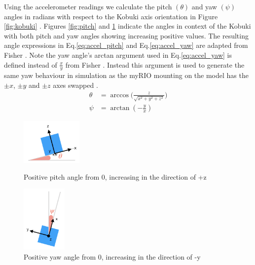 \vspace{-0.2cm} \noindent Using the accelerometer readings we calculate the pitch $(\theta)$ and yaw $(\psi)$ angles in radians with respect to the Kobuki axis orientation in Figure \ref{fig:kobuki} \cite{fisher_2011}.
Figures \ref{fig:pitch} and \ref{fig:yaw} indicate the angles in context of the Kobuki with both pitch and yaw angles showing increasing positive values. The resulting angle expressions in Eq.\ref{eq:accel_pitch} and Eq.\ref{eq:accel_yaw} are adapted from Fisher \cite{fisher_2011}. Note the yaw angle's arctan argument used in Eq.\ref{eq:accel_yaw} is defined instead of $\frac{x}{y}$ from Fisher \cite{fisher_2011}. Instead this argument is used to generate the same yaw behaviour in simulation as the myRIO mounting on the model has the $\pm x$, $\pm y$ and $\pm z$ axes swapped \cite[p.~235]{labguide}.
\begin{align}
    \theta &= \arccos \biggr( \frac{z}{\sqrt{x^2 + y^2 + z^2}} \biggr)\label{eq:accel_pitch}\\
    \psi &= \arctan(-\frac{y}{x})\label{eq:accel_yaw}
\end{align}
\vspace{-0.2cm}
\begin{figure}[H]
    \centering
    \begin{minipage}{0.45\textwidth}
    \centering
    \vspace{1cm}
    \includegraphics[width=3cm]{Images/Pitch.png}
    \caption{Positive pitch angle from 0, increasing in the direction of +z}
    \label{fig:pitch}
    \end{minipage}%
    \hspace{0.5cm}
    \begin{minipage}{0.45\textwidth}
    \centering
    \includegraphics[width=2.2cm]{Images/Yaw.png}
    \caption{Positive yaw angle from 0, increasing in the direction of -y}
    \label{fig:yaw}
    \end{minipage}
\end{figure}

